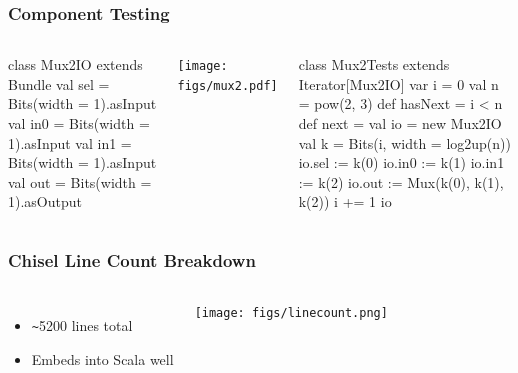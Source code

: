 \documentclass[xcolor=pdflatex,dvipsnames,table]{beamer}
\begin{document}
\begin{frame}[fragile]
\frametitle{Component Testing}


\begin{columns}

{
\begin{scala}
class Mux2IO extends Bundle {
  val sel = Bits(width = 1).asInput
  val in0 = Bits(width = 1).asInput
  val in1 = Bits(width = 1).asInput
  val out = Bits(width = 1).asOutput
}
\end{scala}
}
\begin{center}
\texttt{[image: figs/mux2.pdf]} 
\end{center}

{
\begin{scala}
class Mux2Tests extends Iterator[Mux2IO] { 
  var i = 0
  val n = pow(2, 3)
  def hasNext = i < n
  def next = { 
    val io  = new Mux2IO
    val k   = Bits(i, width = log2up(n))
    io.sel := k(0)
    io.in0 := k(1)
    io.in1 := k(2)
    io.out := Mux(k(0), k(1), k(2))
    i      += 1
    io
  }
}
\end{scala}
}

\end{columns}

\end{frame}

\begin{frame}[fragile]
\frametitle{Chisel Line Count Breakdown}

\begin{columns}


\begin{itemize}
\item \verb+~+5200 lines total
\item Embeds into Scala well
\end{itemize}


\begin{center}
\texttt{[image: figs/linecount.png]}
\end{center}

\end{columns}

\end{frame}
\end{document}
